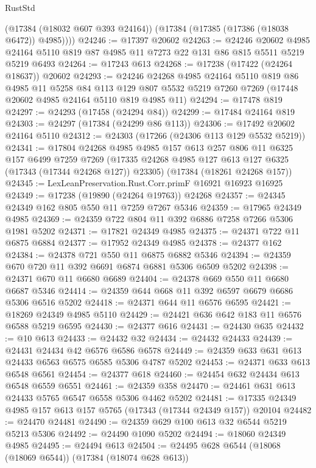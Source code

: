 \begin{lexlean}{RustStd}
\begin{coremodule}
        (@17384 (@18032 @607 @393 @24164))
        (@17384 (@17385 (@17386 (@18038 @6472)) @4985))))
@24246 := @17397 @20602
@24263 := @24246
    @20602
    @4985
    @24164
    @5110
    @819
    @87
    @4985
    @11
    @7273
    @22
    @131
    @86
    @815
    @5511
    @5219
    @5219
    @6493
@24264 := @17243 @613
@24268 := @17238 (@17422 (@24264 @18637)) @20602
@24293 := @24246
    @24268
    @4985
    @24164
    @5110
    @819
    @86
    @4985
    @11
    @5258
    @84
    @113
    @129
    @807
    @5532
    @5219
    @7260
    @7269
    (@17448 @20602 @4985 @24164 @5110 @819 @4985 @11)
@24294 := @17478 @819
@24297 := @24293 (@17458 (@24294 @84))
@24299 := @17484 @24164 @819
@24303 := @24297 (@17384 (@24299 @86 @113))
@24306 := @17492 @20602 @24164 @5110
@24312 := @24303 (@17266 (@24306 @113 @129 @5532 @5219))
@24341 := @17804
    @24268
    @4985
    @4985
    @157
    @613
    @257
    @806
    @11
    @6325
    @157
    @6499
    @7259
    @7269
    (@17335 @24268 @4985 @127 @613 @127 @6325 (@17343 (@17344 @24268 @127)) @23305)
    (@17384 (@18261 @24268 @157))
@24345 := LexLeanPreservation.Rust.Corr.primF @16921 @16923 @16925
@24349 := @17238 (@19890 (@24264 @19763)) @24268
@24357 := @24345 @24349 @162 @805 @550 @11 @7259 @7267 @5346
@24359 := @17965 @24349 @4985
@24369 := @24359 @722 @804 @11 @392 @6886 @7258 @7266 @5306 @1981 @5202
@24371 := @17821 @24349 @4985
@24375 := @24371 @722 @11 @6875 @6884
@24377 := @17952 @24349 @4985
@24378 := @24377 @162
@24384 := @24378 @721 @550 @11 @6875 @6882 @5346
@24394 := @24359 @670 @720 @11 @392 @6691 @6874 @6881 @5306 @6509 @5202
@24398 := @24371 @670 @11 @6680 @6689
@24404 := @24378 @669 @550 @11 @6680 @6687 @5346
@24414 := @24359 @644 @668 @11 @392 @6597 @6679 @6686 @5306 @6516 @5202
@24418 := @24371 @644 @11 @6576 @6595
@24421 := @18269 @24349 @4985 @5110
@24429 := @24421 @636 @642 @183 @11 @6576 @6588 @5219 @6595
@24430 := @24377 @616
@24431 := @24430 @635
@24432 := @10 @613
@24433 := @24432 @32
@24434 := @24432 @24433
@24439 := @24431 @24434 @42 @6576 @6586 @6578
@24449 := @24359 @633 @631 @613 @24433 @6563 @6575 @6585 @5306 @4787 @5202
@24453 := @24371 @633 @613 @6548 @6561
@24454 := @24377 @618
@24460 := @24454 @632 @24434 @613 @6548 @6559 @6551
@24461 := @24359 @358
@24470 := @24461 @631 @613 @24433 @5765 @6547 @6558 @5306 @4462 @5202
@24481 := @17335 @24349 @4985 @157 @613 @157 @5765 (@17343 (@17344 @24349 @157)) @20104
@24482 := @24470 @24481
@24490 := @24359 @629 @100 @613 @32 @6544 @5219 @5213 @5306
@24492 := @24490 @1090 @5202
@24494 := @18060 @24349 @4985
@24495 := @24494 @613
@24504 := @24495 @628 @6544 (@18068 (@18069 @6544)) (@17384 (@18074 @628 @613))

\end{coremodule}
\end{lexlean}
